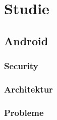\chapter{Studie}
\section{Android}


\subsection{Security}

\subsection{Architektur}

\subsection{Probleme}